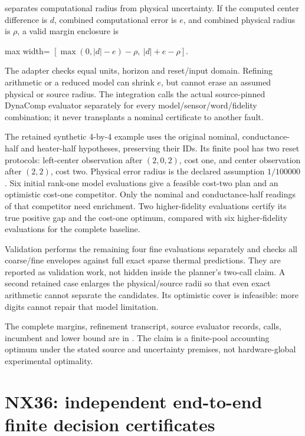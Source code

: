 \documentclass[
  11pt,
  a4paper,
]{report}
\let\singularitytexttt\texttt
\renewcommand{\texttt}[1]{\singularitytexttt{\seqsplit{#1}}}
\begin{document}
\texttt{BoundedReading} separates computational radius from physical
uncertainty. If the computed center difference is \(d\), combined
computational error is \(e\), and combined physical radius is \(\rho\),
a valid margin enclosure is

\begin{center}
\begin{adjustbox}{max width=\linewidth}
$\displaystyle
[\max(0,|d|-e)-\rho,\ |d|+e-\rho].
$
\end{adjustbox}
\end{center}

The adapter checks equal units, horizon and reset/input domain. Refining
arithmetic or a reduced model can shrink \(e\), but cannot erase an
assumed physical or source radius. The integration calls the actual
source-pinned DynaComp evaluator separately for every
model/sensor/word/fidelity combination; it never transplants a nominal
certificate to another fault.

The retained synthetic 4-by-4 example uses the original nominal,
conductance-half and heater-half hypotheses, preserving their IDs. Its
finite pool has two reset protocols: left-center observation after
\((2,0,2)\), cost one, and center observation after \((2,2)\), cost two.
Physical error radius is the declared assumption \(1/100000\). Six
initial rank-one model evaluations give a feasible cost-two plan and an
optimistic cost-one competitor. Only the nominal and conductance-half
readings of that competitor need enrichment. Two higher-fidelity
evaluations certify its true positive gap and the cost-one optimum,
compared with six higher-fidelity evaluations for the complete baseline.

Validation performs the remaining four fine evaluations separately and
checks all coarse/fine envelopes against full exact sparse thermal
predictions. They are reported as validation work, not hidden inside the
planner's two-call claim. A second retained case enlarges the
physical/source radii so that even exact arithmetic cannot separate the
candidates. Its optimistic cover is infeasible: more digits cannot
repair that model limitation.

The complete margins, refinement transcript, source evaluator records,
calls, incumbent and lower bound are in
\texttt{results/nx36/nx35\_acceptance.json}. The claim is a finite-pool
accounting optimum under the stated source and uncertainty premises, not
hardware-global experimental optimality.

\hypertarget{nx36-independent-end-to-end-finite-decision-certificates}{%
\chapter{NX36: independent end-to-end finite decision
certificates}\label{nx36-independent-end-to-end-finite-decision-certificates}}
\end{document}
